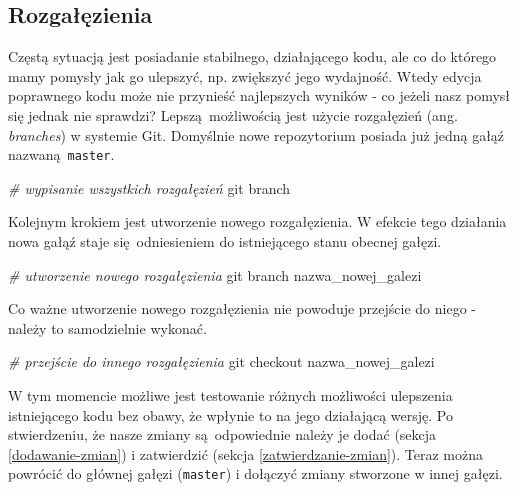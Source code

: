 \documentclass[paper=6in:9in,pagesize=pdftex,headinclude=on,footinclude=on,10pt]{scrbook}
\newenvironment{Shaded}{\begin{snugshade}}{\end{snugshade}}
\newcommand{\CommentTok}[1]{\textcolor[rgb]{0.56,0.35,0.01}{\textit{#1}}}
\newcommand{\FunctionTok}[1]{\textcolor[rgb]{0.00,0.00,0.00}{#1}}
\newcommand{\NormalTok}[1]{#1}
\begin{document}
\hypertarget{branches}{%
\subsection{Rozgałęzienia}\label{branches}}

Częstą sytuacją jest posiadanie stabilnego, działającego kodu, ale co do którego mamy pomysły jak go ulepszyć, np. zwiększyć jego wydajność.
Wtedy edycja poprawnego kodu może nie przynieść najlepszych wyników - co jeżeli nasz pomysł się jednak nie sprawdzi?
Lepszą~możliwością jest użycie rozgałęzień (ang. \emph{branches}) w systemie Git.
Domyślnie nowe repozytorium posiada już jedną gałąź nazwaną~\texttt{master}.

\begin{Shaded}
\begin{Highlighting}[]
\CommentTok{# wypisanie wszystkich rozgałęzień}
\FunctionTok{git}\NormalTok{ branch}
\end{Highlighting}
\end{Shaded}

Kolejnym krokiem jest utworzenie nowego rozgałęzienia.
W efekcie tego działania nowa gałąź staje się~odniesieniem do istniejącego stanu obecnej gałęzi.

\begin{Shaded}
\begin{Highlighting}[]
\CommentTok{# utworzenie nowego rozgałęzienia}
\FunctionTok{git}\NormalTok{ branch nazwa_nowej_galezi}
\end{Highlighting}
\end{Shaded}

Co ważne utworzenie nowego rozgałęzienia nie powoduje przejście do niego - należy to samodzielnie wykonać.

\begin{Shaded}
\begin{Highlighting}[]
\CommentTok{# przejście do innego rozgałęzienia}
\FunctionTok{git}\NormalTok{ checkout nazwa_nowej_galezi}
\end{Highlighting}
\end{Shaded}

W tym momencie możliwe jest testowanie różnych możliwości ulepszenia istniejącego kodu bez obawy, że wpłynie to na jego działającą wersję.
Po stwierdzeniu, że nasze zmiany są~odpowiednie należy je dodać (sekcja \ref{dodawanie-zmian}) i zatwierdzić (sekcja \ref{zatwierdzanie-zmian}).
Teraz można powrócić do głównej gałęzi (\texttt{master}) i dołączyć zmiany stworzone w innej gałęzi.
\end{document}
